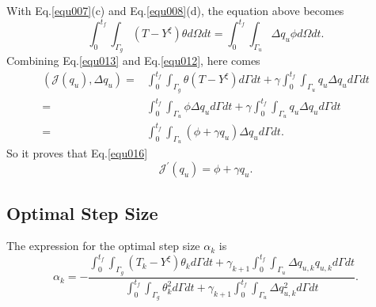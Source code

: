 \documentclass[UTF-8]{article}
\begin{document}
With Eq.\ref{equ007}(c) and Eq.\ref{equ008}(d), the equation above becomes
\begin{equation}\label{equ012}
	\int_{0}^{t_f} \int_{\Gamma_g} \left( T-Y^\xi \right) \theta d\Omega dt = \int_{0}^{t_f} \int_{\Gamma_u} \Delta q_u \phi d\Omega dt.
\end{equation}
Combining Eq.\ref{equ013} and Eq.\ref{equ012}, here comes
\begin{align}\label{equ014}
		\left(\mathcal{J}(q_u),\Delta q_u \right) =& \int_{0}^{t_f} \int_{\Gamma_g} \theta \left( T - Y^\xi \right) d\Gamma dt + \gamma \int_{0}^{t_f} \int_{\Gamma_u} q_u \Delta q_u d\Gamma dt \nonumber \\
	=& \int_{0}^{t_f} \int_{\Gamma_u} \phi \Delta q_u d\Gamma dt + \gamma \int_{0}^{t_f} \int_{\Gamma_u} q_u \Delta q_u d\Gamma dt \nonumber \\
	=& \int_{0}^{t_f} \int_{\Gamma_u} \left( \phi + \gamma q_u \right) \Delta q_u d\Gamma dt.
\end{align}
So it proves that Eq.\ref{equ016}
\begin{equation}\label{equ016}
	\mathcal{J}^\prime (q_{u}) = \phi + \gamma q_{u}.
\end{equation}

\subsection{Optimal Step Size}
The expression for the optimal step size $\alpha_k$ is
\begin{equation}\label{equ017}
	\alpha_k = -\frac{\int_{0}^{t_f} \int_{\Gamma_g} \left(T_k - Y^\xi\right) \theta_k d\Gamma dt + \gamma_{k+1} \int_{0}^{t_f} \int_{\Gamma_u} \Delta q_{u,k} q_{u,k} d\Gamma dt }{\int_{0}^{t_f} \int_{\Gamma_g} \theta_k^2 d\Gamma dt + \gamma_{k+1} \int_{0}^{t_f} \int_{\Gamma_u} \Delta q_{u,k}^2 d\Gamma dt }.
\end{equation}
\end{document}

